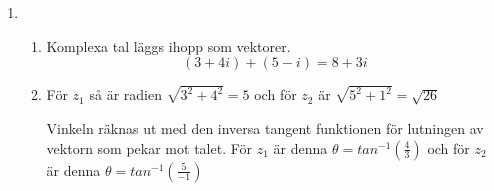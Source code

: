 \documentclass[a4paper,12pt]{article}
\begin{document}
\begin{enumerate}
    \item \begin{enumerate}
              \item Komplexa tal läggs ihopp som vektorer.
                    $$(3+4i)+(5-i)=8+3i$$
              \item För $z_1$ så är radien $\sqrt{3^2+4^2}=5$ och för
                    $z_2$ är $\sqrt{5^2+1^2}=\sqrt{26}$

                    Vinkeln räknas ut med den inversa tangent funktionen
                    för lutningen av vektorn som pekar mot talet.
                    För $z_1$ är denna $\theta = tan^{-1}(\frac{4}{3})$
                    och för $z_2$ är denna $\theta = tan^{-1}(\frac{5}{-1})$
          \end{enumerate}
\end{enumerate}
\end{document}
